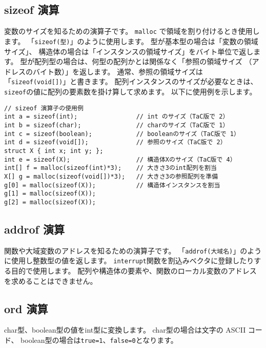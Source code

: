 \subsection{sizeof 演算}

変数のサイズを知るための演算子です。
\verb/malloc/ で領域を割り付けるとき使用します。
「\verb/sizeof(型)/」のように使用します。
型が基本型の場合は「変数の領域サイズ」、
構造体の場合は「インスタンスの領域サイズ」をバイト単位で返します。
型が配列型の場合は、何型の配列かとは関係なく「参照の領域サイズ
（アドレスのバイト数）」を返します。
通常、参照の領域サイズは「\verb/sizeof(void[])/」と書きます。
配列インスタンスのサイズが必要なときは、
\verb/sizeof/の値に配列の要素数を掛け算して求めます。
以下に使用例を示します。

\begin{mylist}
\begin{verbatim}
// sizeof 演算子の使用例
int a = sizeof(int);                // int のサイズ（TaC版で 2）
int b = sizeof(char);               // charのサイズ（TaC版で 1）
int c = sizeof(boolean);            // booleanのサイズ（TaC版で 1）
int d = sizeof(void[]);             // 参照のサイズ（TaC版で 2）
struct X { int x; int y; };
int e = sizeof(X);                  // 構造体Xのサイズ（TaC版で 4）
int[] f = malloc(sizeof(int)*3);    // 大きさ3のint配列を割当
X[] g = malloc(sizeof(void[])*3);   // 大きさ3の参照配列を準備
g[0] = malloc(sizeof(X));           // 構造体インスタンスを割当
g[1] = malloc(sizeof(X));
g[2] = malloc(sizeof(X));
\end{verbatim}
\end{mylist}

\subsection{addrof 演算}
\label{chap3:addrof}

関数や大域変数のアドレスを知るための演算子です。
「\verb/addrof(大域名)/」のように使用し整数型の値を返します。
\verb/interrupt/関数を割込みベクタに登録したりする目的で使用します。
配列や構造体の要素や、関数のローカル変数のアドレスを求めることはできません。

\subsection{ord 演算}
\label{chap3:ord}

char型、boolean型の値をint型に変換します。
char型の場合は文字の ASCII コード、
boolean型の場合は\verb/true=1/、\verb/false=0/となります。

